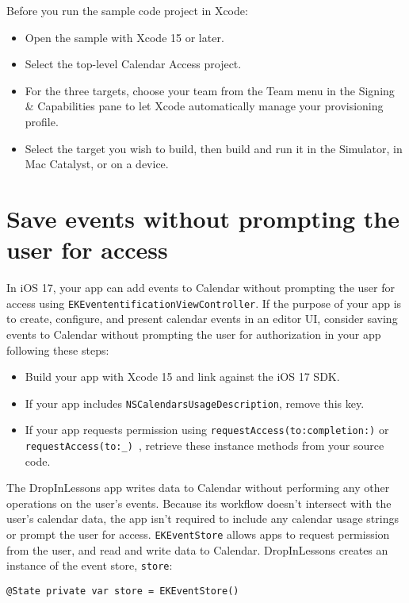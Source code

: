 \documentclass{article}
\begin{document}
Before you run the sample code project in Xcode:

\begin{itemize}
    \item Open the sample with Xcode 15 or later.
    \item Select the top-level Calendar Access project.
    \item For the three targets, choose your team from the Team menu in the Signing \& Capabilities pane to let Xcode automatically manage your provisioning profile.
    \item Select the target you wish to build, then build and run it in the Simulator, in Mac Catalyst, or on a device.
\end{itemize}

\section*{Save events without prompting the user for access}

In iOS 17, your app can add events to Calendar without prompting the user for access using \texttt{EKEvententificationViewController}. If the purpose of your app is to create, configure, and present calendar events in an editor UI, consider saving events to Calendar without prompting the user for authorization in your app following these steps:

\begin{itemize}
    \item Build your app with Xcode 15 and link against the iOS 17 SDK.
    \item If your app includes \texttt{NSCalendarsUsageDescription}, remove this key.
    \item If your app requests permission using \texttt{requestAccess(to:completion:)} or \texttt{requestAccess(to:_) }, retrieve these instance methods from your source code.
\end{itemize}

The DropInLessons app writes data to Calendar without performing any other operations on the user's events. Because its workflow doesn't intersect with the user's calendar data, the app isn't required to include any calendar usage strings or prompt the user for access. \texttt{EKEventStore} allows apps to request permission from the user, and read and write data to Calendar. DropInLessons creates an instance of the event store, \texttt{store}:

\texttt{@State private var store = EKEventStore()}
\end{document}
